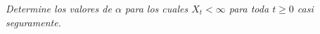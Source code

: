\emph{
	Determine los valores  de $\alpha$ para los cuales $X_t < \infty$ para toda $t \geq 0$ casi seguramente.
}

\afterstatement\pn